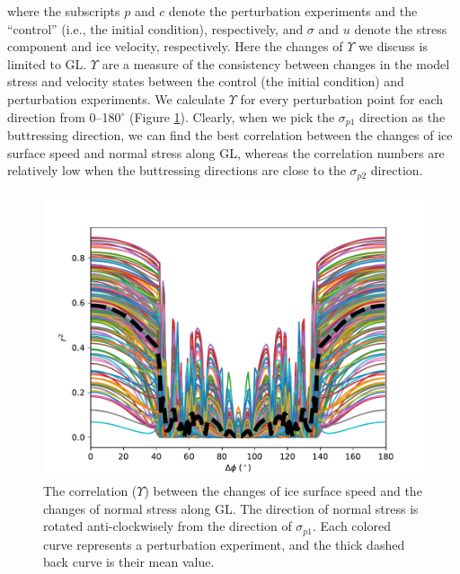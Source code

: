 \documentclass[review,oneside]{igs}
\begin{document}
where the subscripts $p$ and $c$ denote the perturbation experiments and the ``control'' (i.e., the initial condition), respectively, and $\sigma$ and $u$ denote the stress component and ice velocity, respectively. Here the changes of $\Upsilon$ we discuss is limited to GL. $\Upsilon$ are a measure of the consistency between changes in the model stress and velocity states between the control (the initial condition) and perturbation experiments. We calculate $\Upsilon$ for every perturbation point for each direction from 0--180$^\circ$ (Figure \ref{stress_vel_corr_GL_allP}). Clearly, when we pick the $\sigma_{p1}$ direction as the buttressing direction, we can find the best correlation between the changes of ice surface speed and normal stress along GL, whereas the correlation numbers are relatively low when the buttressing directions are close to the $\sigma_{p2}$ direction.  
\begin{figure}
	\centering
    \includegraphics[width=1\linewidth]{figs/stress_vel_corr_GL_allP.pdf}
    \caption{The correlation ($\Upsilon$) between the changes of ice surface speed and the changes of normal stress along GL. The direction of normal stress is rotated anti-clockwisely from the direction of $\sigma_{p1}$. Each colored curve represents a perturbation experiment, and the thick dashed back curve is their mean value.}
	\label{stress_vel_corr_GL_allP}
\end{figure}
\end{document}
